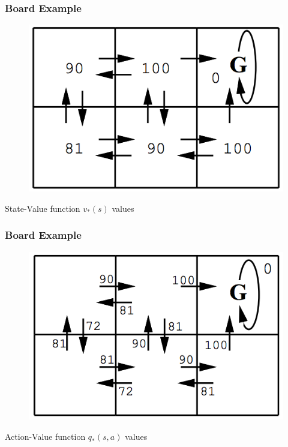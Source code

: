 \documentclass{beamer}
\begin{document}
\begin{frame}
\frametitle{Board Example}
\begin{figure}[t]
\includegraphics[scale=0.3]{Board2}
\centering
\end{figure}
State-Value function $v_*(s)$ values
\centering
\end{frame}

\begin{frame}
\frametitle{Board Example}
\begin{figure}[t]
\includegraphics[scale=0.3]{Board3}
\centering
\end{figure}
Action-Value function $q_*(s,a)$ values
\centering
\end{frame}
\end{document}
